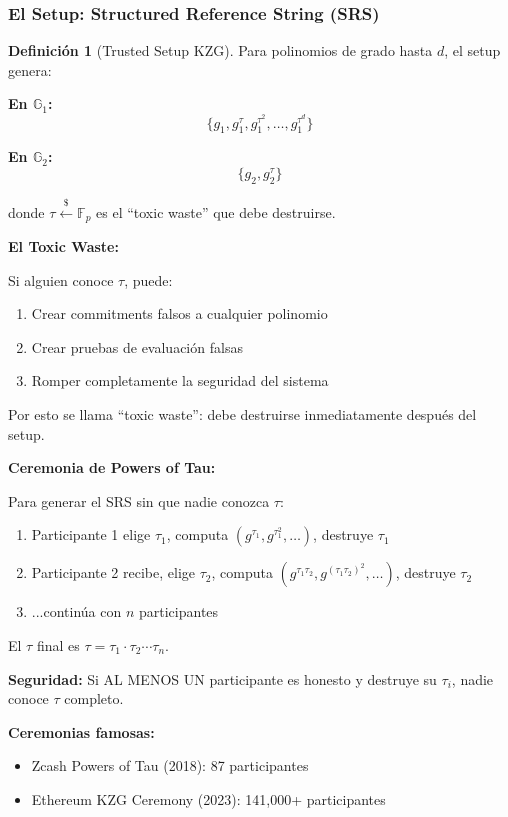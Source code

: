 \documentclass[11pt,a4paper,twoside,openright]{book}
\theoremstyle{definition}
\newtheorem{definition}{Definición}[chapter]
\theoremstyle{plain}
\theoremstyle{remark}
\begin{document}
\subsubsection{El Setup: Structured Reference String (SRS)}

\begin{definition}[Trusted Setup KZG]
Para polinomios de grado hasta $d$, el setup genera:

\textbf{En $\mathbb{G}_1$:}
\[ \{g_1, g_1^\tau, g_1^{\tau^2}, \ldots, g_1^{\tau^d}\} \]

\textbf{En $\mathbb{G}_2$:}
\[ \{g_2, g_2^\tau\} \]

donde $\tau \xleftarrow{\$} \mathbb{F}_p$ es el ``toxic waste'' que debe destruirse.
\end{definition}

\begin{advertencia}
\textbf{El Toxic Waste:}

Si alguien conoce $\tau$, puede:
\begin{enumerate}
    \item Crear commitments falsos a cualquier polinomio
    \item Crear pruebas de evaluación falsas
    \item Romper completamente la seguridad del sistema
\end{enumerate}

Por esto se llama ``toxic waste'': debe destruirse inmediatamente después del setup.
\end{advertencia}

\begin{keyidea}
\textbf{Ceremonia de Powers of Tau:}

Para generar el SRS sin que nadie conozca $\tau$:
\begin{enumerate}
    \item Participante 1 elige $\tau_1$, computa $(g^{\tau_1}, g^{\tau_1^2}, \ldots)$, destruye $\tau_1$
    \item Participante 2 recibe, elige $\tau_2$, computa $(g^{\tau_1 \tau_2}, g^{(\tau_1\tau_2)^2}, \ldots)$, destruye $\tau_2$
    \item ...continúa con $n$ participantes
\end{enumerate}

El $\tau$ final es $\tau = \tau_1 \cdot \tau_2 \cdots \tau_n$.

\textbf{Seguridad:} Si AL MENOS UN participante es honesto y destruye su $\tau_i$, nadie conoce $\tau$ completo.

\textbf{Ceremonias famosas:}
\begin{itemize}
    \item Zcash Powers of Tau (2018): 87 participantes
    \item Ethereum KZG Ceremony (2023): 141,000+ participantes
\end{itemize}
\end{keyidea}
\end{document}
